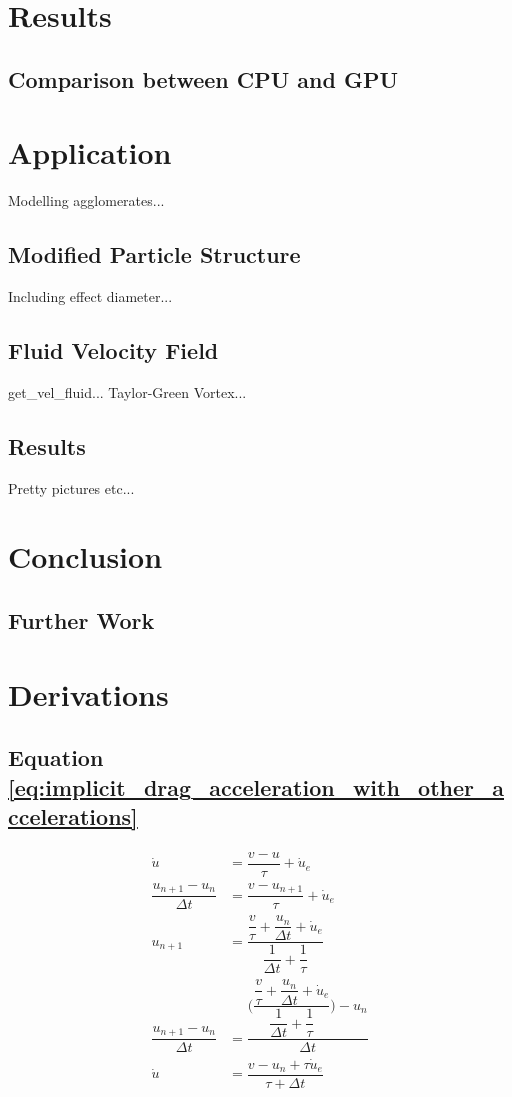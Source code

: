 \documentclass[10pt,a4paper,titlepage]{report}
\begin{document}
\chapter{Results}
\section{Comparison between CPU and GPU}
\chapter{Application}
Modelling agglomerates...
\section{Modified Particle Structure}
Including effect diameter...
\section{Fluid Velocity Field}
get\_vel\_fluid... Taylor-Green Vortex...
\section{Results}
Pretty pictures etc...
\chapter{Conclusion}
\section{Further Work}
\appendix
\chapter{Derivations}
\section{Equation \ref{eq:implicit_drag_acceleration_with_other_accelerations}}
\label{sec:implicit_drag_accel_derivation}
\begin{align}
\dot{u} &= \dfrac{v - u}{\tau} + \dot{u}_{e}
\\\dfrac{u_{n+1} - u_{n}}{\Delta t} &= \dfrac{v - u_{n+1}}{\tau} + \dot{u}_{e}
\\u_{n+1} &= \dfrac{\dfrac{v}{\tau} + \dfrac{u_{n}}{\Delta t} + \dot{u}_{e}}{\dfrac{1}{\Delta t} + \dfrac{1}{\tau}}
\\\dfrac{u_{n+1} - u_{n}}{\Delta t} &= \dfrac{\Bigg(\dfrac{\dfrac{v}{\tau} + \dfrac{u_{n}}{\Delta t} + \dot{u}_{e}}{\dfrac{1}{\Delta t} + \dfrac{1}{\tau}}\Bigg) - u_{n}}{\Delta t}
\\\dot{u} &= \dfrac{v - u_{n} + \tau \dot{u}_{e}}{\tau + \Delta t}
\end{align}


\end{document}
